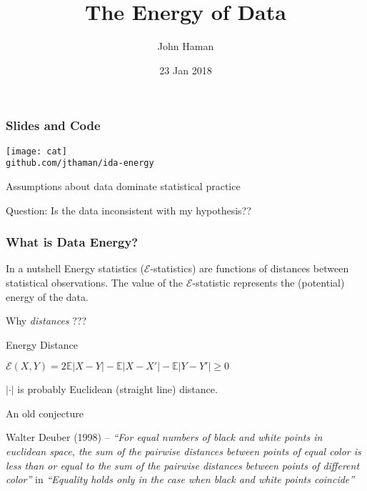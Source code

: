 \documentclass[presentation]{beamer}
\author{John Haman}
\institute{Bowling Green State University, Institute for Defense Analyses}
\date{23 Jan 2018}
\title{The Energy of Data}
\begin{document}
\maketitle

\begin{frame}
  \frametitle{Slides and Code}
  \centering
  \texttt{[image: cat]}\\
  \centering
  \texttt{github.com/jthaman/ida-energy}
\end{frame}

\begin{frame}
  Assumptions about data dominate statistical practice
  \begin{block}{Question:}
    Is the data inconsistent with my hypothesis??
  \end{block}
\end{frame}

\begin{frame}
  \frametitle{What is Data Energy?}
  \begin{centering}
    \begin{block}{In a nutshell}
      Energy statistics ($\mathcal{E}$-statistics) are functions of
      distances between statistical observations. The value of the
      $\mathcal{E}$-statistic represents the (potential) energy of the
      data.
    \end{block}
  \end{centering}
  \pause
  \begin{center}
    Why \textit{distances} ??? 
  \end{center}
\end{frame}


\begin{frame}
  \begin{block}{Energy Distance}
    \begin{center}
      $\mathcal{E}(X,Y) = 2\mathbb{E}|X - Y| - \mathbb{E}|X - X'| -
      \mathbb{E}|Y - Y'| \geq 0$
    \end{center}
  \end{block}
  \centering
  $|\cdot|$ is probably Euclidean (straight line) distance.
\end{frame}


\begin{frame}{An old conjecture}
  \begin{block}{Walter Deuber (1998) -- }
    \textit{``For equal numbers of black and white points in euclidean
      space, the sum of the pairwise distances between points of equal
      color is less than or equal to the sum of the pairwise distances
      between points of different color''}  in
    \textit{``Equality holds only in the case when black and white
      points coincide''}
  \end{block}
\end{frame}
\end{document}
